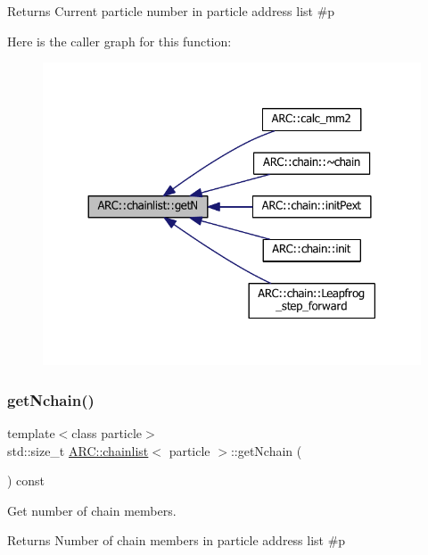 \begin{DoxyReturn}{Returns}
Current particle number in particle address list \#p 
\end{DoxyReturn}
Here is the caller graph for this function\+:
\nopagebreak
\begin{figure}[H]
\begin{center}
\leavevmode
\includegraphics[width=330pt]{classARC_1_1chainlist_a9b45780f42626b14e3a2fd7b5de4bf32_icgraph}
\end{center}
\end{figure}
\hypertarget{classARC_1_1chainlist_aa1bd568975acc3bab3410e4fc9cb4d94}{}\label{classARC_1_1chainlist_aa1bd568975acc3bab3410e4fc9cb4d94} 
\subsubsection{\texorpdfstring{get\+Nchain()}{getNchain()}}
{\footnotesize\ttfamily template$<$class particle$>$ \\
std\+::size\+\_\+t \hyperlink{classARC_1_1chainlist}{A\+R\+C\+::chainlist}$<$ particle $>$\+::get\+Nchain (\begin{DoxyParamCaption}{ }\end{DoxyParamCaption}) const\hspace{0.3cm}{\ttfamily [inline]}}



Get number of chain members. 

\begin{DoxyReturn}{Returns}
Number of chain members in particle address list \#p 
\end{DoxyReturn}
\hypertarget{classARC_1_1chainlist_a14c6b75c2d3e97cf9babcac2aa014e8a}{}\label{classARC_1_1chainlist_a14c6b75c2d3e97cf9babcac2aa014e8a} 
